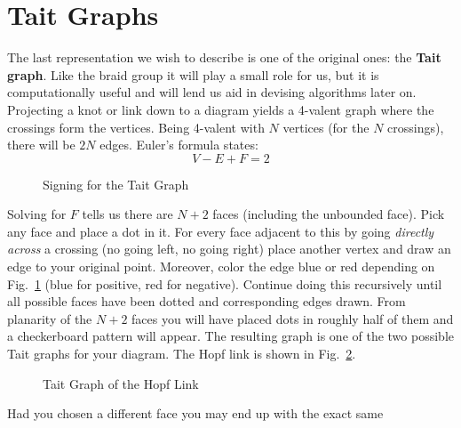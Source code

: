 \documentclass{article}
\theoremstyle{plain}
\begin{document}
    \section{Tait Graphs}
        The last representation we wish to describe is one of the original
        ones: the \textbf{Tait graph}. Like the braid group it will play a
        small role for us, but it is computationally useful and will lend
        us aid in devising algorithms later on. Projecting a knot or link down
        to a diagram yields a 4-valent graph where the crossings form the
        vertices. Being 4-valent with $N$ vertices (for the $N$ crossings),
        there will be $2N$ edges. Euler's formula states:
        \begin{equation}
            V-E+F=2
        \end{equation}
        \begin{figure}
            \centering
            \caption{Signing for the Tait Graph}
            \label{fig:tait_graph_signs}
        \end{figure}
        Solving for $F$ tells us there are $N+2$ faces (including the unbounded
        face). Pick any face and place a dot in it.
        For every face adjacent to this by going \textit{directly across} a
        crossing (no going left, no going right) place another vertex and
        draw an edge to your original point. Moreover, color the edge blue or
        red depending on Fig.~\ref{fig:tait_graph_signs}
        (blue for positive, red for
        negative). Continue doing this recursively until all possible faces
        have been dotted and corresponding edges drawn. From planarity of the
        $N+2$ faces you will have placed dots in roughly half of them and a
        checkerboard pattern will appear. The resulting graph is one of the
        two possible Tait graphs for your diagram. The Hopf link is shown in
        Fig.~\ref{fig:hopf_link_tait_graph_002}.
        \begin{figure}
            \centering
            \caption{Tait Graph of the Hopf Link}
            \label{fig:hopf_link_tait_graph_002}
        \end{figure}
        \par\hfill\par
        Had you chosen a different face you may end up with the exact same
\end{document}
